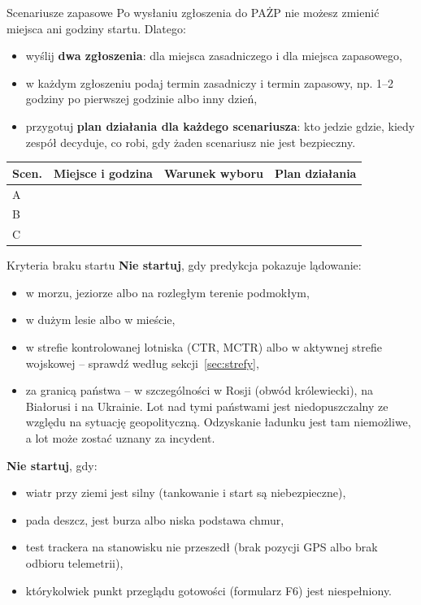 \begin{sekcja}{Scenariusze zapasowe}\label{sec:scenariusze}
Po wysłaniu zgłoszenia do PAŻP nie możesz zmienić miejsca ani godziny startu. Dlatego:
\begin{itemize}
  \item wyślij \textbf{dwa zgłoszenia}: dla miejsca zasadniczego i dla miejsca zapasowego,
  \item w każdym zgłoszeniu podaj termin zasadniczy i termin zapasowy, np. 1--2 godziny po pierwszej godzinie albo inny dzień,
  \item przygotuj \textbf{plan działania dla każdego scenariusza}: kto jedzie gdzie, kiedy zespół decyduje, co robi, gdy żaden scenariusz nie jest bezpieczny.
\end{itemize}

\renewcommand{\arraystretch}{1.6}
\begin{tabularx}{\linewidth}{@{}|P{12mm}|L|L|L|@{}}\hline
\textbf{Scen.} & \textbf{Miejsce i godzina} & \textbf{Warunek wyboru} & \textbf{Plan działania}\\\hline
A & & & \\\hline
B & & & \\\hline
C & & & \\\hline
\end{tabularx}
\end{sekcja}

\begin{sekcja}{Kryteria braku startu}\label{sec:kryteria}
\textbf{Nie startuj}, gdy predykcja pokazuje lądowanie:
\begin{itemize}
  \item w morzu, jeziorze albo na rozległym terenie podmokłym,
  \item w dużym lesie albo w mieście,
  \item w strefie kontrolowanej lotniska (CTR, MCTR) albo w aktywnej strefie wojskowej -- sprawdź według sekcji~\ref{sec:strefy},
  \item za granicą państwa -- w szczególności w Rosji (obwód królewiecki), na Białorusi i na Ukrainie. Lot nad tymi państwami jest niedopuszczalny ze względu na sytuację geopolityczną. Odzyskanie ładunku jest tam niemożliwe, a lot może zostać uznany za incydent.
\end{itemize}

\textbf{Nie startuj}, gdy:
\begin{itemize}
  \item wiatr przy ziemi jest silny (tankowanie i start są niebezpieczne),
  \item pada deszcz, jest burza albo niska podstawa chmur,
  \item test trackera na stanowisku nie przeszedł (brak pozycji GPS albo brak odbioru telemetrii),
  \item którykolwiek punkt przeglądu gotowości (formularz F6) jest niespełniony.
\end{itemize}
\end{sekcja}

